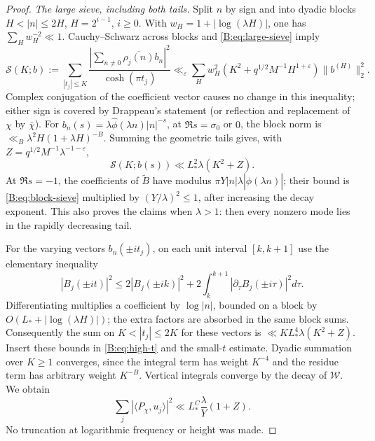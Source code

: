 \documentclass[10pt,reqno]{amsart}
\theoremstyle{definition}
\numberwithin{equation}{section}
\begin{document}
\begin{proof}
\emph{The large sieve, including both tails.}
Split \(n\) by sign and into dyadic blocks \(H<|n|\le2H\),
\(H=2^{i-1}\), \(i\ge0\). With
\(w_H=1+|\log(\lambda H)|\), one has \(\sum_Hw_H^{-2}\ll1\).
Cauchy--Schwarz across blocks and \eqref{B:eq:large-sieve} imply
\[
 \mathcal S(K;b):=\sum_{|t_j|\le K}\frac{|\sum_{n\ne0}\overline{\rho_j(n)}b_n|^2}
                                             {\cosh(\pi t_j)}
 \ll_\varepsilon\sum_H w_H^2
       (K^2+q^{1/2}M^{-1}H^{1+\varepsilon})\|b^{(H)}\|_2^2.
\]
Complex conjugation of the coefficient vector causes no change in this
inequality; either sign is covered by Drappeau's statement (or reflection
and replacement of \(\chi\) by \(\bar\chi\)). For
\(b_n(s)=\lambda\widehat\phi(\lambda n)|n|^{-s}\), at
\(\Re s=\sigma_0\) or \(0\), the block norm is
\(\ll_B\lambda^2H(1+\lambda H)^{-B}\).
Summing the geometric tails gives, with
\(Z=q^{1/2}M^{-1}\lambda^{-1-\varepsilon}\),
\begin{equation}\label{B:eq:block-sieve}
 \mathcal S(K;b(s))\ll L_*^2\lambda(K^2+Z).
\end{equation}
At \(\Re s=-1\), the coefficients of \(\widetilde B\) have modulus
\(\pi Y|n|\lambda|\widehat\phi(\lambda n)|\); their bound is
\eqref{B:eq:block-sieve} multiplied by \((Y/\lambda)^2\le1\), after
increasing the decay exponent. This also proves the claims when
\(\lambda>1\): then every nonzero mode lies in the rapidly decreasing tail.

For the varying vectors \(b_n(\pm it_j)\), on each unit interval
\([k,k+1]\) use the elementary inequality
\[
 |B_j(\pm it)|^2\le2|B_j(\pm ik)|^2+
              2\int_k^{k+1}|\partial_\tau B_j(\pm i\tau)|^2d\tau.
\]
Differentiating multiplies a coefficient by \(\log|n|\), bounded on a
block by \(O(L_*+|\log(\lambda H)|)\); the extra factors are absorbed
in the same block sums. Consequently the sum on \(K<|t_j|\le2K\)
for these vectors is \(\ll K L_*^4\lambda(K^2+Z)\).
Insert these bounds in \eqref{B:eq:high-t} and the small-\(t\) estimate.
Dyadic summation over \(K\ge1\) converges, since the integral term has
weight \(K^{-4}\) and the residue term has arbitrary weight \(K^{-B}\).
Vertical integrals converge by the decay of \(\mathcal W\). We obtain
\[
 \sum_j|\langle P_\chi,u_j\rangle|^2
       \ll L_*^C\frac\lambda Y(1+Z).
\]
No truncation at logarithmic frequency or height was made.


\end{proof}
\end{document}
